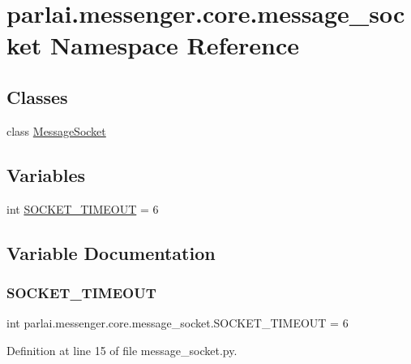 \hypertarget{namespaceparlai_1_1messenger_1_1core_1_1message__socket}{}\section{parlai.\+messenger.\+core.\+message\+\_\+socket Namespace Reference}
\label{namespaceparlai_1_1messenger_1_1core_1_1message__socket}
\subsection*{Classes}
\begin{DoxyCompactItemize}
\item 
class \hyperlink{classparlai_1_1messenger_1_1core_1_1message__socket_1_1MessageSocket}{Message\+Socket}
\end{DoxyCompactItemize}
\subsection*{Variables}
\begin{DoxyCompactItemize}
\item 
int \hyperlink{namespaceparlai_1_1messenger_1_1core_1_1message__socket_a0142c7fd757af86f709ff08a2ef4e06c}{S\+O\+C\+K\+E\+T\+\_\+\+T\+I\+M\+E\+O\+UT} = 6
\end{DoxyCompactItemize}


\subsection{Variable Documentation}
\mbox{\label{namespaceparlai_1_1messenger_1_1core_1_1message__socket_a0142c7fd757af86f709ff08a2ef4e06c}} 
\subsubsection{\texorpdfstring{S\+O\+C\+K\+E\+T\+\_\+\+T\+I\+M\+E\+O\+UT}{SOCKET\_TIMEOUT}}
{\footnotesize\ttfamily int parlai.\+messenger.\+core.\+message\+\_\+socket.\+S\+O\+C\+K\+E\+T\+\_\+\+T\+I\+M\+E\+O\+UT = 6}



Definition at line 15 of file message\+\_\+socket.\+py.

